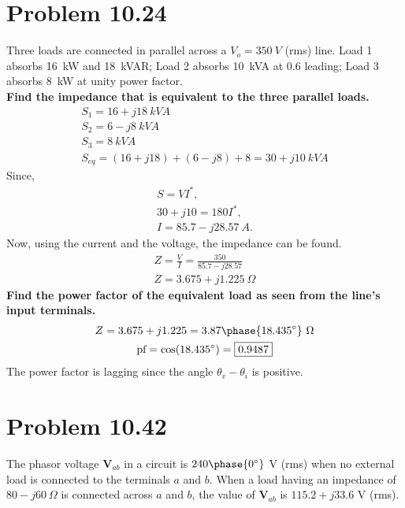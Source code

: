 \documentclass[12pt]{article}
\begin{document}
    \section*{Problem 10.24}
    Three loads are connected in parallel across a $V_{o} = 350\ V$ (rms) line.
    Load 1 absorbs 16\ kW and 18\ kVAR; Load 2 absorbs 10\ kVA at 0.6 leading;
    Load 3 absorbs 8\ kW at unity power factor.
    \\
    \textbf{Find the impedance that is equivalent to the three parallel loads.}
    \begin{gather*}
        S_1 = 16 + j 18\ kVA \\
        S_2 = 6 - j 8\ kVA \\
        S_3 = 8\ kVA \\
        S_{eq} = (16 + j 18) + (6 - j 8) + 8 = 30 + j 10\ kVA
    \end{gather*}
    Since,
    \begin{gather*}
        S = VI^{*}, \\
        30 + j 10 = 180 I^{*}, \\
        I = 85.7 - j 28.57\ A.
    \end{gather*}
    Now, using the current and the voltage, the impedance can be found.
    \begin{gather*}
        Z = \frac{V}{I} = \frac{350}{85.7 - j 28.57} \\
        \boxed{Z = 3.675 + j 1.225\ \Omega}
    \end{gather*}
    \textbf{Find the power factor of the equivalent load as seen from the line's
    input terminals.}
    \begin{gather*}
        Z = 3.675 + j 1.225 = 3.87 \phase{18.435^{\circ}}\ \Omega \\
        \text{pf} = \cos (18.435^{\circ}) = \boxed{0.9487}
    \end{gather*}
    The power factor is lagging since the angle $\theta_{v} - \theta_{i}$ is
    positive.
    \section*{Problem 10.42}
    The phasor voltage $\textbf{V}_{ab}$ in a circuit is $240 \phase{0^{\circ}}$
    V (rms) when no external load is connected to the terminals $a$ and $b$.
    When a load having an impedance of $80 - j 60\ \Omega$ is connected across
    $a$ and $b$, the value of $\textbf{V}_{ab}$ is $115.2 + j 33.6$ V (rms).
\end{document}
